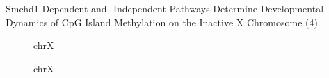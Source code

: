 \documentclass[
  a4paper,
  openany]{scrbook}
\begin{document}
Smchd1-Dependent and -Independent Pathways Determine Developmental
Dynamics of CpG Island Methylation on the Inactive X Chromosome (4)

\begin{figure}


\caption{\label{fig-CPG_not_normalized}chrX}

\end{figure}%

\begin{figure}


\caption{\label{fig-CPG_normalized_chrx}chrX}

\end{figure}%
\end{document}
